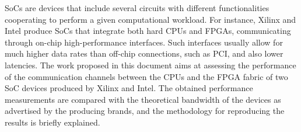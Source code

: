 \acp{SoC} are devices that include several circuits with different functionalities cooperating to perform a given computational workload. For instance, Xilinx and Intel produce \acp{SoC} that integrate both hard \acp{CPU} and \acp{FPGA}, communicating through on-chip high-performance interfaces. Such interfaces usually allow for much higher data rates than off-chip connections, such as \ac{PCI}, and also lower latencies. The work proposed in this document aims at assessing the performance of the communication channels between the \acp{CPU} and the \ac{FPGA} fabric of two \ac{SoC} devices produced by Xilinx and Intel. The obtained performance measurements are compared with the theoretical bandwidth of the devices as advertised by the producing brands, and the methodology for reproducing the results is briefly explained.